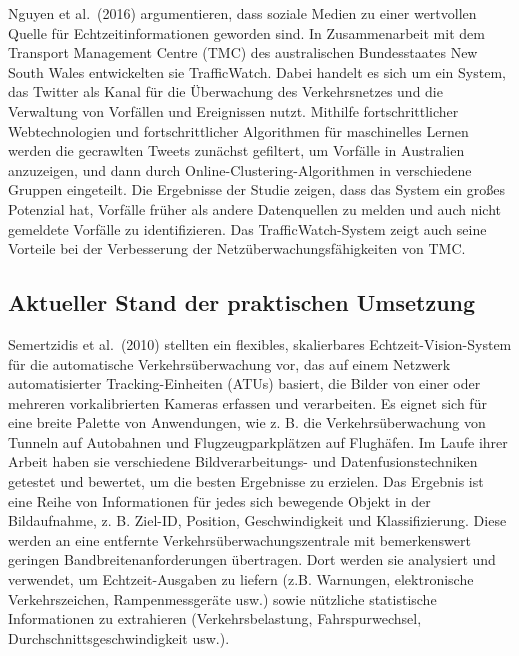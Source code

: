 \documentclass[
]{book}
\begin{document}
Nguyen et al.~(2016) argumentieren, dass soziale Medien zu einer wertvollen Quelle für Echtzeitinformationen geworden sind. In Zusammenarbeit mit dem Transport Management Centre (TMC) des australischen Bundesstaates New South Wales entwickelten sie TrafficWatch. Dabei handelt es sich um ein System, das Twitter als Kanal für die Überwachung des Verkehrsnetzes und die Verwaltung von Vorfällen und Ereignissen nutzt. Mithilfe fortschrittlicher Webtechnologien und fortschrittlicher Algorithmen für maschinelles Lernen werden die gecrawlten Tweets zunächst gefiltert, um Vorfälle in Australien anzuzeigen, und dann durch Online-Clustering-Algorithmen in verschiedene Gruppen eingeteilt. Die Ergebnisse der Studie zeigen, dass das System ein großes Potenzial hat, Vorfälle früher als andere Datenquellen zu melden und auch nicht gemeldete Vorfälle zu identifizieren. Das TrafficWatch-System zeigt auch seine Vorteile bei der Verbesserung der Netzüberwachungsfähigkeiten von TMC.

\hypertarget{aktueller-stand-der-praktischen-umsetzung-11}{%
\subsection*{Aktueller Stand der praktischen Umsetzung}\label{aktueller-stand-der-praktischen-umsetzung-11}}

Semertzidis et al.~(2010) stellten ein flexibles, skalierbares Echtzeit-Vision-System für die automatische Verkehrsüberwachung vor, das auf einem Netzwerk automatisierter Tracking-Einheiten (ATUs) basiert, die Bilder von einer oder mehreren vorkalibrierten Kameras erfassen und verarbeiten. Es eignet sich für eine breite Palette von Anwendungen, wie z. B. die Verkehrsüberwachung von Tunneln auf Autobahnen und Flugzeugparkplätzen auf Flughäfen. Im Laufe ihrer Arbeit haben sie verschiedene Bildverarbeitungs- und Datenfusionstechniken getestet und bewertet, um die besten Ergebnisse zu erzielen. Das Ergebnis ist eine Reihe von Informationen für jedes sich bewegende Objekt in der Bildaufnahme, z. B. Ziel-ID, Position, Geschwindigkeit und Klassifizierung. Diese werden an eine entfernte Verkehrsüberwachungszentrale mit bemerkenswert geringen Bandbreitenanforderungen übertragen. Dort werden sie analysiert und verwendet, um Echtzeit-Ausgaben zu liefern (z.B. Warnungen, elektronische Verkehrszeichen, Rampenmessgeräte usw.) sowie nützliche statistische Informationen zu extrahieren (Verkehrsbelastung, Fahrspurwechsel, Durchschnittsgeschwindigkeit usw.).
\end{document}
